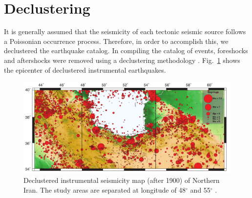 \section{Declustering}

It is generally assumed that the seismicity of each tectonic seismic source follows a Poissonian occurrence process. Therefore, in order to accomplish this, we declustered the earthquake catalog. In compiling the catalog of events, foreshocks and aftershocks were removed using a declustering methodology \citep{Gardner1974}. Fig.~\ref{fig:instrumental} shows the epicenter of declustered instrumental  earthquakes.

\begin{figure} [H]
\centering
\includegraphics[scale=0.8]{figures/pdf/Figure3.pdf} 
\caption{Declustered instrumental seismicity map (after 1900) of Northern Iran. The study areas are separated at longitude of 48$^{\circ}$ and 55$^{\circ}$ . } 
\label{fig:instrumental}
\end{figure}




